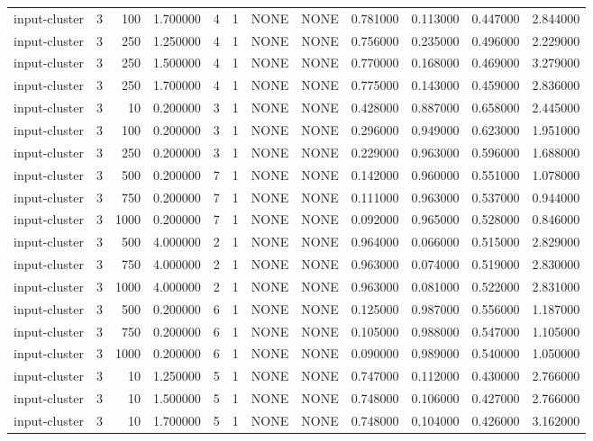 \begin{tabular}{lrrrllllrrrr}
input-cluster & 3 & 100 & 1.700000 & 4 & 1 & NONE & NONE & 0.781000 & 0.113000 & 0.447000 & 2.844000 \\
input-cluster & 3 & 250 & 1.250000 & 4 & 1 & NONE & NONE & 0.756000 & 0.235000 & 0.496000 & 2.229000 \\
input-cluster & 3 & 250 & 1.500000 & 4 & 1 & NONE & NONE & 0.770000 & 0.168000 & 0.469000 & 3.279000 \\
input-cluster & 3 & 250 & 1.700000 & 4 & 1 & NONE & NONE & 0.775000 & 0.143000 & 0.459000 & 2.836000 \\
input-cluster & 3 & 10 & 0.200000 & 3 & 1 & NONE & NONE & 0.428000 & 0.887000 & 0.658000 & 2.445000 \\
input-cluster & 3 & 100 & 0.200000 & 3 & 1 & NONE & NONE & 0.296000 & 0.949000 & 0.623000 & 1.951000 \\
input-cluster & 3 & 250 & 0.200000 & 3 & 1 & NONE & NONE & 0.229000 & 0.963000 & 0.596000 & 1.688000 \\
input-cluster & 3 & 500 & 0.200000 & 7 & 1 & NONE & NONE & 0.142000 & 0.960000 & 0.551000 & 1.078000 \\
input-cluster & 3 & 750 & 0.200000 & 7 & 1 & NONE & NONE & 0.111000 & 0.963000 & 0.537000 & 0.944000 \\
input-cluster & 3 & 1000 & 0.200000 & 7 & 1 & NONE & NONE & 0.092000 & 0.965000 & 0.528000 & 0.846000 \\
input-cluster & 3 & 500 & 4.000000 & 2 & 1 & NONE & NONE & 0.964000 & 0.066000 & 0.515000 & 2.829000 \\
input-cluster & 3 & 750 & 4.000000 & 2 & 1 & NONE & NONE & 0.963000 & 0.074000 & 0.519000 & 2.830000 \\
input-cluster & 3 & 1000 & 4.000000 & 2 & 1 & NONE & NONE & 0.963000 & 0.081000 & 0.522000 & 2.831000 \\
input-cluster & 3 & 500 & 0.200000 & 6 & 1 & NONE & NONE & 0.125000 & 0.987000 & 0.556000 & 1.187000 \\
input-cluster & 3 & 750 & 0.200000 & 6 & 1 & NONE & NONE & 0.105000 & 0.988000 & 0.547000 & 1.105000 \\
input-cluster & 3 & 1000 & 0.200000 & 6 & 1 & NONE & NONE & 0.090000 & 0.989000 & 0.540000 & 1.050000 \\
input-cluster & 3 & 10 & 1.250000 & 5 & 1 & NONE & NONE & 0.747000 & 0.112000 & 0.430000 & 2.766000 \\
input-cluster & 3 & 10 & 1.500000 & 5 & 1 & NONE & NONE & 0.748000 & 0.106000 & 0.427000 & 2.766000 \\
input-cluster & 3 & 10 & 1.700000 & 5 & 1 & NONE & NONE & 0.748000 & 0.104000 & 0.426000 & 3.162000 \\

\end{tabular}
